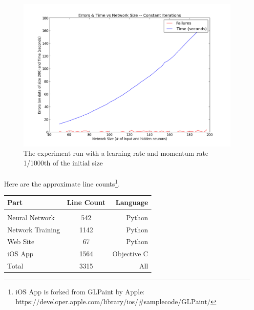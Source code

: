 \documentclass{article}
\begin{document}
    \begin{figure}
        \centering
        \includegraphics[scale=0.5]{images/good_learning.png}
        \caption{The experiment run with a learning rate and momentum rate 
            1/1000th of the initial size}
        \label{goodgraph}
    \end{figure}

    \paragraph{}Here are the approximate line 
    counts\footnote{iOS App is forked from GLPaint by Apple: 
    https://developer.apple.com/library/ios/\#samplecode/GLPaint/}. \\

    \begin{tabular}{ l c r }
        Part & Line Count & Language \\
        \hline \\
        Neural Network & 542 & Python \\
        Network Training & 1142 & Python \\
        Web Site & 67 & Python \\
        iOS App & 1564 & Objective C \\
        Total & 3315 & All \\
    \end{tabular}
\end{document}
